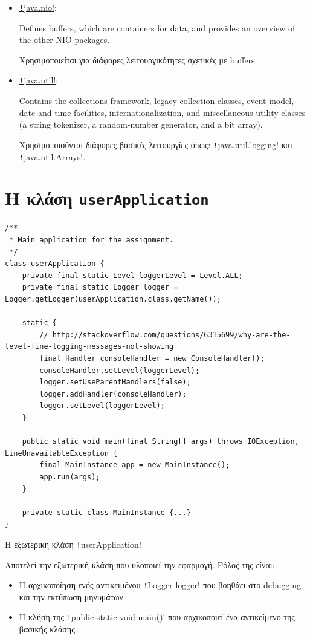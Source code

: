 \begin{itemize}
\item
\href{https://docs.oracle.com/javase/8/docs/api/java/nio/package-summary.html}{\texttt!java.nio!}:
\begin{displayquote}
Defines buffers, which are containers for data, and provides an overview of the other NIO packages.
\end{displayquote}
Χρησιμοποιείται για διάφορες λειτουργικότητες σχετικές με buffers.

\item
\href{https://docs.oracle.com/javase/8/docs/api/java/util/package-summary.html}{\texttt!java.util!}:
\begin{displayquote}
Contains the collections framework, legacy collection classes, event model, date and time facilities, internationalization, and miscellaneous utility classes (a string tokenizer, a random-number generator, and a bit array).
\end{displayquote}
\sloppy Χρησιμοποιούνται διάφορες βασικές λειτουργίες όπως:
\texttt!java.util.logging! και \texttt!java.util.Arrays!.
\end{itemize}

\section{Η κλάση \texttt{userApplication}}
\begin{code}
\begin{verbatim}
/**
 * Main application for the assignment.
 */
class userApplication {
    private final static Level loggerLevel = Level.ALL;
    private final static Logger logger = Logger.getLogger(userApplication.class.getName());

    static {
        // http://stackoverflow.com/questions/6315699/why-are-the-level-fine-logging-messages-not-showing
        final Handler consoleHandler = new ConsoleHandler();
        consoleHandler.setLevel(loggerLevel);
        logger.setUseParentHandlers(false);
        logger.addHandler(consoleHandler);
        logger.setLevel(loggerLevel);
    }

    public static void main(final String[] args) throws IOException, LineUnavailableException {
        final MainInstance app = new MainInstance();
        app.run(args);
    }

    private static class MainInstance {...}
}
\end{verbatim}
\caption{Η εξωτερική κλάση \texttt!userApplication!}
\end{code}
Αποτελεί την εξωτερική κλάση που υλοποιεί την εφαρμογή.
Ρόλος της είναι:
\begin{itemize}
\item Η αρχικοποίηση ενός αντικειμένου \texttt!Logger logger! που βοηθάει στο debugging και την εκτύπωση μηνυμάτων.
\item Η κλήση της \texttt!public static void main()! που αρχικοποιεί ένα αντικείμενο της βασικής κλάσης .
\end{itemize}

